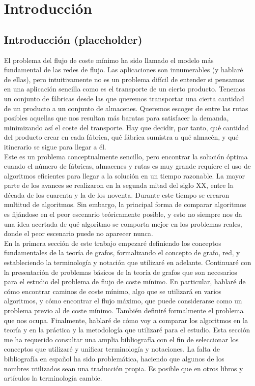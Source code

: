 \section{Introducción}\label{s:intro}

\subsection{Introducción (placeholder)}

El problema del flujo de coste mínimo ha sido llamado el modelo más fundamental de las redes de flujo.
Las aplicaciones son innumerables (y hablaré de ellas), pero intuitivamente no es un problema difícil de entender si pensamos en una aplicación sencilla como es el transporte de un cierto producto.
Tenemos un conjunto de fábricas desde las que queremos transportar una cierta cantidad de un producto a un conjunto de almacenes.
Queremos escoger de entre las rutas posibles aquellas que nos resultan más baratas para satisfacer la demanda, minimizando así el coste del transporte.
Hay que decidir, por tanto, qué cantidad del producto crear en cada fábrica, qué fábrica sumistra a qué almacén, y qué itinerario se sigue para llegar a él.\\

Este es un problema conceptualmente sencillo, pero encontrar la solución óptima cuando el número de fábricas, almacenes y rutas es muy grande requiere el uso de algoritmos eficientes para llegar a la solución en un tiempo razonable.
La mayor parte de los avances se realizaron en la segunda mitad del siglo XX, entre la década de los cuarenta y la de los noventa.
Durante este tiempo se crearon multitud de algoritmos.
Sin embargo, la principal forma de comparar algoritmos es fijándose en el peor escenario teóricamente posible, y esto no siempre nos da una idea acertada de qué algoritmo se comporta mejor en los problemas reales, donde el peor escenario puede no aparecer nunca.\\

En la primera sección de este trabajo empezaré definiendo los conceptos fundamentales de la teoría de grafos, formalizando el concepto de grafo, red, y estableciendo la terminología y notación que utilizaré en adelante.
Continuaré con la presentación de problemas básicos de la teoría de grafos que son necesarios para el estudio del problema de flujo de coste mínimo.
En particular, hablaré de cómo encontrar caminos de coste mínimo, algo que se utilizará en varios algoritmos, y cómo encontrar el flujo máximo, que puede considerarse como un problema previo al de coste mínimo.
También definiré formalmente el problema que nos ocupa.
Finalmente, hablaré de cómo voy a comparar los algoritmos en la teoría y en la práctica y la metodología que utilizaré para el estudio.
Esta sección me ha requerido consultar una amplia bibliografía con el fin de seleccionar los conceptos que utilizaré y unificar terminología y notaciones.
La falta de bibliografía en español ha sido problemática, haciendo que algunos de los nombres utilizados sean una traducción propia.
Es posible que en otros libros y artículos la terminología cambie.\\

